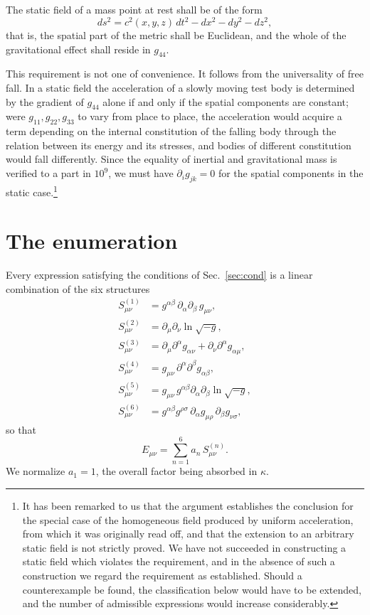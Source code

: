 \documentclass[aps,prd,reprint,amsmath,amssymb,nofootinbib,longbibliography]{revtex4-2}
\begin{document}
The static field of a mass point at rest shall be of the form
\begin{equation}
ds^{2} = c^{2}(x,y,z)\,dt^{2} - dx^{2} - dy^{2} - dz^{2} ,
\label{eq:static}
\end{equation}
that is, the spatial part of the metric shall be Euclidean, and the whole of the gravitational
effect shall reside in $g_{44}$.

This requirement is not one of convenience. It follows from the universality of free fall. In a
static field the acceleration of a slowly moving test body is determined by the gradient of $g_{44}$
alone if and only if the spatial components are constant; were $g_{11}, g_{22}, g_{33}$ to vary from
place to place, the acceleration would acquire a term depending on the internal constitution of the
falling body through the relation between its energy and its stresses, and bodies of different
constitution would fall differently. Since the equality of inertial and gravitational mass is
verified to a part in $10^{9}$, we must have $\partial_i g_{jk} = 0$ for the spatial components in
the static case.\footnote{It has been remarked to us that the argument establishes the conclusion
for the special case of the homogeneous field produced by uniform acceleration, from which it was
originally read off, and that the extension to an arbitrary static field is not strictly proved. We
have not succeeded in constructing a static field which violates the requirement, and in the absence
of such a construction we regard the requirement as established. Should a counterexample be found,
the classification below would have to be extended, and the number of admissible expressions would
increase considerably.}

\section{The enumeration}
\label{sec:enum}

Every expression satisfying the conditions of Sec.~\ref{sec:cond} is a linear combination of the six
structures
\begin{align}
S^{(1)}_{\mu\nu} &= g^{\alpha\beta}\, \partial_\alpha \partial_\beta\, g_{\mu\nu} , \\
S^{(2)}_{\mu\nu} &= \partial_\mu \partial_\nu \ln\sqrt{-g} , \\
S^{(3)}_{\mu\nu} &= \partial_\mu \partial^\alpha g_{\alpha\nu}
                  + \partial_\nu \partial^\alpha g_{\alpha\mu} , \\
S^{(4)}_{\mu\nu} &= g_{\mu\nu}\, \partial^\alpha \partial^\beta g_{\alpha\beta} , \\
S^{(5)}_{\mu\nu} &= g_{\mu\nu}\, g^{\alpha\beta}\partial_\alpha\partial_\beta \ln\sqrt{-g} , \\
S^{(6)}_{\mu\nu} &= g^{\alpha\beta} g^{\rho\sigma}\,
                    \partial_\alpha g_{\mu\rho}\, \partial_\beta g_{\nu\sigma} ,
\end{align}
so that
\begin{equation}
E_{\mu\nu} = \sum_{n=1}^{6} a_n\, S^{(n)}_{\mu\nu} .
\label{eq:E}
\end{equation}
We normalize $a_1 = 1$, the overall factor being absorbed in $\kappa$.
\end{document}
